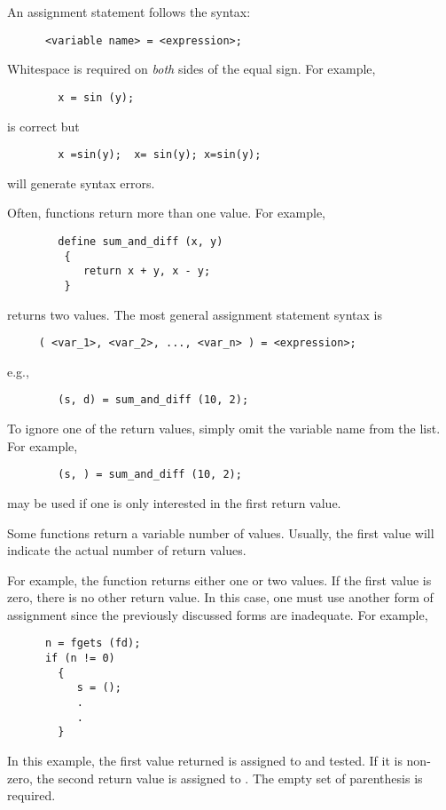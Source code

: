    An assignment statement follows the syntax:
\begin{verbatim}   
      <variable name> = <expression>;
\end{verbatim}
   Whitespace is required on {\em both} sides of the equal sign.  For example,
\begin{verbatim}
        x = sin (y);
\end{verbatim}
   is correct but
\begin{verbatim}
        x =sin(y);  x= sin(y); x=sin(y);
\end{verbatim}
   will generate syntax errors.
   
   Often, functions return more than one value.  For example, 
\begin{verbatim}
        define sum_and_diff (x, y)
         {
            return x + y, x - y;
         }
\end{verbatim}
   returns two values.  The most general assignment statement syntax is 
\begin{verbatim}
     ( <var_1>, <var_2>, ..., <var_n> ) = <expression>;
\end{verbatim}
   e.g.,
\begin{verbatim}
        (s, d) = sum_and_diff (10, 2);
\end{verbatim}
   To ignore one of the return values, simply omit the variable name from
   the list.  For example, 
   
\begin{verbatim}
        (s, ) = sum_and_diff (10, 2);
\end{verbatim}
   may be used if one is only interested in the first return value.
   
   Some functions return a variable number of values.  Usually, the first
   value will indicate the actual number of return values.

   For example, the  function returns either one or two values.  If
   the first value is zero, there is no other return value.  In this case,
   one must use another form of assignment since the previously discussed
   forms are inadequate.  For example,    
\begin{verbatim}
      n = fgets (fd);
      if (n != 0)
        {
           s = ();
           .
           .
        }
\end{verbatim}
   In this example, the first value returned is assigned to  and tested.
   If it is non-zero, the second return value is assigned to .   The
   empty set of parenthesis is required.

